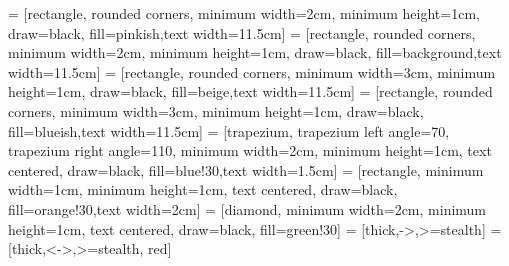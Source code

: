\usepackage[ruled,vlined,noresetcount]{algorithm2e}

\usetikzlibrary{calc}
\usetikzlibrary{backgrounds,intersections,fit}
\newcommand*\ab{.4}


\usetikzlibrary{shapes.geometric,arrows,shapes.symbols,decorations.pathreplacing,positioning,decorations.markings, matrix, overlay-beamer-styles}
 = [rectangle, rounded corners, minimum width=2cm, minimum height=1cm, draw=black, fill=pinkish,text width=11.5cm]
 = [rectangle, rounded corners, minimum width=2cm, minimum height=1cm, draw=black, fill=background,text width=11.5cm]
 = [rectangle, rounded corners, minimum width=3cm, minimum height=1cm, draw=black, fill=beige,text width=11.5cm]
 = [rectangle, rounded corners, minimum width=3cm, minimum height=1cm, draw=black, fill=blueish,text width=11.5cm]
 = [trapezium, trapezium left angle=70, trapezium right angle=110, minimum width=2cm, minimum height=1cm, text centered, draw=black, fill=blue!30,text width=1.5cm]
 = [rectangle, minimum width=1cm, minimum height=1cm, text centered, draw=black, fill=orange!30,text width=2cm]
 = [diamond, minimum width=2cm, minimum height=1cm, text centered, draw=black, fill=green!30]
 = [thick,->,>=stealth]
 = [thick,<->,>=stealth, red]


\newcommand\mycirc[1][]{\tikz\node[circle,myshade=#1]{};}
\newcommand\myrect[1][]{\tikz\node[rectangle,myshade=#1]{};}
\newcommand\mystar[1][]{\tikz\node[star,star points=15,star point height=2pt,myshade=#1]{};}
\newcommand\mydiamond[1][]{\tikz\node[diamond,myshade=#1]{};}
\newcommand\myellipse[1][]{\tikz\node[ellipse,myshade=#1]{};}
\newcommand\mykite[1][]{\tikz\node[kite,myshade=#1]{};}
\newcommand\mydart[1][]{\tikz\node[dart,myshade=#1]{};}
\newcommand\mycloud[1][]{\tikz\node[cloud,myshade=#1]{};}


